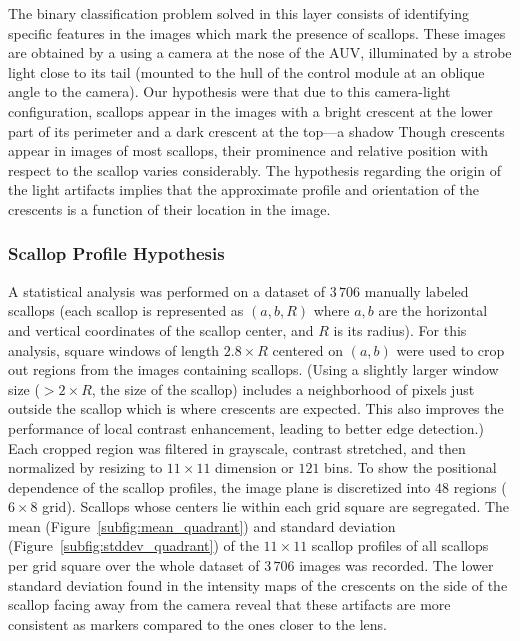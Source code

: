 \documentclass {udthesis}
\begin{document}
The binary classification problem solved in this layer consists of identifying specific features in the images which mark the presence of scallops.
These images are obtained by a using a 
camera at the nose of the AUV, illuminated by a strobe light close to its tail 
(mounted to the hull of the control module at an oblique angle to the camera).
Our hypothesis were that due to this camera-light configuration, scallops appear in the images with 
a bright crescent at the lower part of its perimeter and a dark crescent at the top---a shadow 
Though crescents appear in images of most scallops, their prominence and relative position with respect to the scallop varies considerably.
The hypothesis regarding the origin of the light artifacts implies that the approximate profile and orientation of the crescents is a function of their location in the image.



\subsubsection{Scallop Profile Hypothesis} \label{subsubsec:scallop_profile_hypothesis}

A statistical analysis was performed on  a dataset of $3\,706$ manually labeled scallops 
(each scallop is represented as $(a,b,R)$ 
where $a,b$ are the horizontal and vertical coordinates of the scallop center, 
and $R$ is its radius). 
For this analysis, square windows of length $2.8\times R$ 
centered on $(a,b)$ were used to crop out regions from the images containing scallops.
(Using a slightly larger window size ($>2\times R$, the size of the scallop) includes
a neighborhood of pixels just outside the scallop which is where 
crescents are expected.
This also improves the performance of local contrast enhancement, leading to better edge detection.)
Each cropped region was filtered in grayscale, contrast stretched, and then normalized
by resizing to $11 \times 11$ dimension or $121$ bins.
To show the positional dependence of the scallop profiles,
the image plane is discretized into $48$ regions ($6\times8$ grid).
Scallops whose centers lie within each grid square are segregated.
The mean (Figure~\ref{subfig:mean_quadrant}) and standard deviation (Figure~\ref{subfig:stddev_quadrant}) 
of the $11 \times 11$ scallop profiles of all scallops per grid square 
over the whole dataset of $3\,706$ images was recorded.
The lower standard deviation found in the intensity maps of the crescents on the side of the scallop facing away from the camera reveal that these artifacts are more consistent as markers compared to the ones closer to the lens. 
\end{document}
